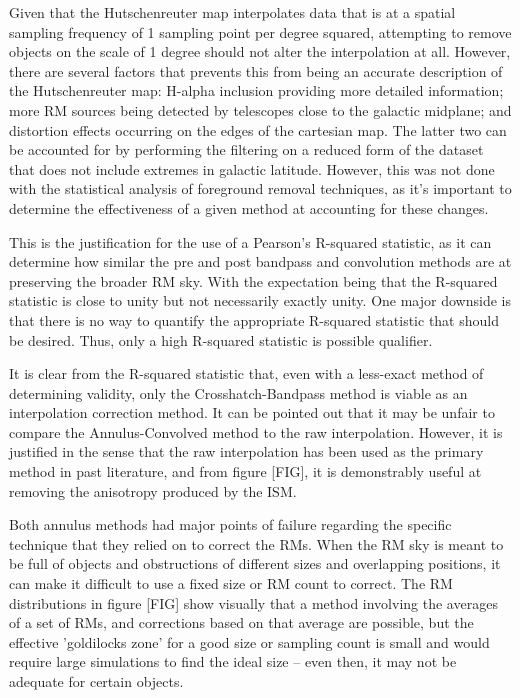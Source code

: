 Given that the Hutschenreuter map interpolates data that is at a spatial sampling frequency of 1 sampling point per degree squared, attempting to remove objects on the scale of 1 degree should not alter the interpolation at all. However, there are several factors that prevents this from being an accurate description of the Hutschenreuter map: H-alpha inclusion providing more detailed information; more RM sources being detected by telescopes close to the galactic midplane; and distortion effects occurring on the edges of the cartesian map. The latter two can be accounted for by performing the filtering on a reduced form of the dataset that does not include extremes in galactic latitude. However, this was not done with the statistical analysis of foreground removal techniques, as it's important to determine the effectiveness of a given method at accounting for these changes.


This is the justification for the use of a Pearson's R-squared statistic, as it can determine how similar the pre and post bandpass and convolution methods are at preserving the broader RM sky. With the expectation being that the R-squared statistic is close to unity but not necessarily exactly unity. One major downside is that there is no way to quantify the appropriate R-squared statistic that should be desired. Thus, only a high R-squared statistic is possible qualifier.


It is clear from the R-squared statistic that, even with a less-exact method of determining validity, only the Crosshatch-Bandpass method is viable as an interpolation correction method. It can be pointed out that it may be unfair to compare the Annulus-Convolved method to the raw interpolation. However, it is justified in the sense that the raw interpolation has been used as the primary method in past literature, and from figure [FIG], it is demonstrably useful at removing the anisotropy produced by the ISM.


Both annulus methods had major points of failure regarding the specific technique that they relied on to correct the RMs. When the RM sky is meant to be full of objects and obstructions of different sizes and overlapping positions, it can make it difficult to use a fixed size or RM count to correct. The RM distributions in figure [FIG] show visually that a method involving the averages of a set of RMs, and corrections based on that average are possible, but the effective 'goldilocks zone' for a good size or sampling count is small and would require large simulations to find the ideal size – even then, it may not be adequate for certain objects.



